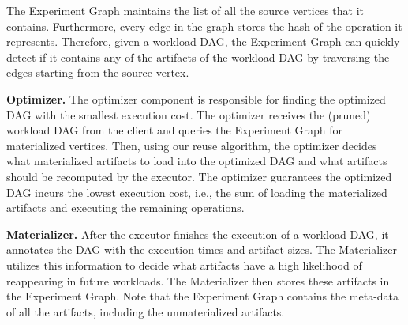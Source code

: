 The Experiment Graph maintains the list of all the source vertices that it contains.
Furthermore, every edge in the graph stores the hash of the operation it represents.
Therefore, given a workload DAG, the Experiment Graph can quickly detect if it contains any of the artifacts of the workload DAG by traversing the edges starting from the source vertex.

\textbf{Optimizer. }
The optimizer component is responsible for finding the optimized DAG with the smallest execution cost.
The optimizer receives the (pruned) workload DAG from the client and queries the Experiment Graph for materialized vertices.
Then, using our reuse algorithm, the optimizer decides what materialized artifacts to load into the optimized DAG and what artifacts should be recomputed by the executor.
The optimizer guarantees the optimized DAG incurs the lowest execution cost, i.e., the sum of loading the materialized artifacts and executing the remaining operations.

\textbf{Materializer.}
After the executor finishes the execution of a workload DAG, it annotates the DAG with the execution times and artifact sizes.
The Materializer utilizes this information to decide what artifacts have a high likelihood of reappearing in future workloads.
The Materializer then stores these artifacts in the Experiment Graph.
Note that the Experiment Graph contains the meta-data of all the artifacts, including the unmaterialized artifacts.



